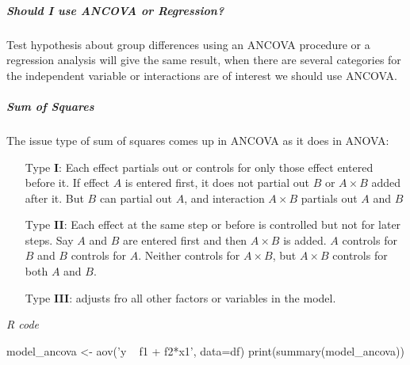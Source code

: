 \subparagraph{Should I use ANCOVA or Regression?}
Test hypothesis about group differences using an ANCOVA procedure or a regression analysis will 
give the same result, when there are several categories for the independent variable or 
interactions are of interest we should use ANCOVA. 
\subparagraph{Sum of Squares}
The issue type  of sum of squares comes up in ANCOVA as it does in ANOVA: 

\begin{itemize}
	\item[Type \textbf{I}:] Each effect partials out or controls for only those effect
		entered before it. If effect $A$ is entered first, it does not partial out $B$ or 
		$A\times B$ added after it. But $B$ can partial out $A$, and interaction $A\times
		B$ partials out $A$ and $B$
	\item[Type \textbf{II}:] Each effect at the same step or before is controlled but not for
		later steps. Say $A$ and $B$ are entered first and then $A\times B$ is added. $A$
		controls for $B$ and $B$ controls for $A$. Neither controls for $A\times B$, but
		$A\times B$ controls for both $A$ and $B$.
	\item[Type \textbf{III}:] adjusts fro all other factors or variables in the model. 
\end{itemize}

\emph{R code}
\begin{rcode}[deletekeywords={model, df}]
model_ancova <- aov('y ~ f1 + f2*x1', data=df)
print(summary(model_ancova))
\end{rcode}

